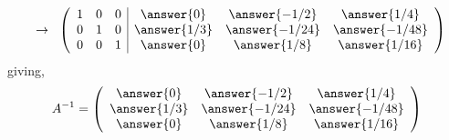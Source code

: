 \documentclass{ximera}
\begin{document}
\begin{exercise}
\begin{prompt}
\[\]
\[
\hspace{.2cm}\rightarrow \hspace{.2cm}
\left(\begin{array}{ccc|ccc}
1 & 0 & 0& \answer{0} & \answer{-1/2} & \answer{1/4}\\
0 & 1 & 0 & \answer{1/3} & \answer{-1/24} & \answer{-1/48}\\
0 & 0 & 1 & \answer{0} & \answer{1/8} & \answer{1/16}
\end{array}\right)
\]
giving,
\[A^{-1}=
\left(\begin{array}{ccc}
 \answer{0} & \answer{-1/2} & \answer{1/4}\\
\answer{1/3} & \answer{-1/24} & \answer{-1/48}\\
 \answer{0} & \answer{1/8} & \answer{1/16}
\end{array}\right)
\]
\end{prompt}
\end{exercise}
\end{document}
